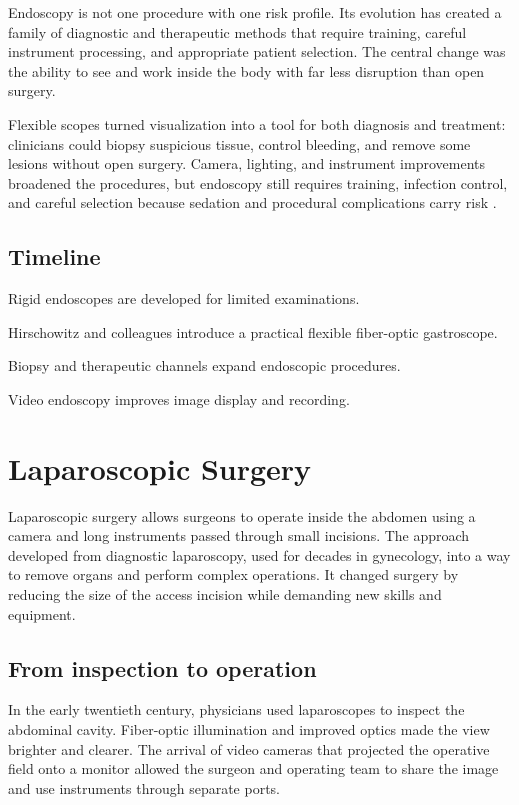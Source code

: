 \documentclass[12pt,oneside]{book}
\begin{document}
Endoscopy is not one procedure with one risk profile. Its evolution has
created a family of diagnostic and therapeutic methods that require training,
careful instrument processing, and appropriate patient selection. The central
change was the ability to see and work inside the body with far less
disruption than open surgery.

Flexible scopes turned visualization into a tool for both diagnosis and
treatment: clinicians could biopsy suspicious tissue, control bleeding, and
remove some lesions without open surgery. Camera, lighting, and instrument
improvements broadened the procedures, but endoscopy still requires training,
infection control, and careful selection because sedation and procedural
complications carry risk \cite{endoscopyHistory}.

\section*{Timeline}
\begin{description}[leftmargin=2.3cm,style=nextline]
  \item[1800s] Rigid endoscopes are developed for limited examinations.
  \item[1957] Hirschowitz and colleagues introduce a practical flexible fiber-optic gastroscope.
  \item[1960s--1970s] Biopsy and therapeutic channels expand endoscopic procedures.
  \item[1980s onward] Video endoscopy improves image display and recording.
\end{description}
\chapter[Laparoscopic Surgery]{Laparoscopic Surgery}

Laparoscopic surgery allows surgeons to operate inside the abdomen using a
camera and long instruments passed through small incisions. The approach
developed from diagnostic laparoscopy, used for decades in gynecology, into a
way to remove organs and perform complex operations. It changed surgery by
reducing the size of the access incision while demanding new skills and
equipment.

\section{From inspection to operation}
In the early twentieth century, physicians used laparoscopes to inspect the abdominal cavity. Fiber-optic illumination and improved optics made the view brighter and clearer. The arrival of video cameras that projected the operative field onto a monitor allowed the surgeon and operating team to share the image and use instruments through separate ports.
\end{document}
